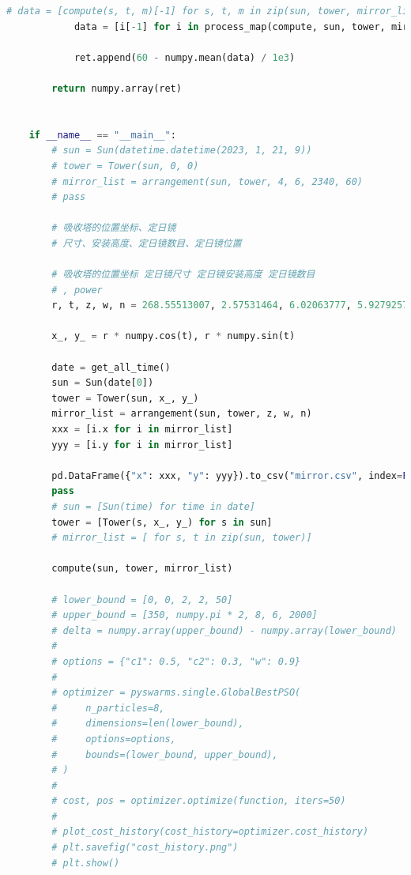 \documentclass[withoutpreface,bwprint]{cumcmthesis} %
\begin{document}
\begin{appendices}
\begin{lstlisting}[language=python]
            # data = [compute(s, t, m)[-1] for s, t, m in zip(sun, tower, mirror_list)]
            data = [i[-1] for i in process_map(compute, sun, tower, mirror_list)]
    
            ret.append(60 - numpy.mean(data) / 1e3)
    
        return numpy.array(ret)
    
    
    if __name__ == "__main__":
        # sun = Sun(datetime.datetime(2023, 1, 21, 9))
        # tower = Tower(sun, 0, 0)
        # mirror_list = arrangement(sun, tower, 4, 6, 2340, 60)
        # pass
    
        # 吸收塔的位置坐标、定日镜
        # 尺寸、安装高度、定日镜数目、定日镜位置
    
        # 吸收塔的位置坐标 定日镜尺寸 定日镜安装高度 定日镜数目
        # , power
        r, t, z, w, n = 268.55513007, 2.57531464, 6.02063777, 5.92792577, 1940
    
        x_, y_ = r * numpy.cos(t), r * numpy.sin(t)
    
        date = get_all_time()
        sun = Sun(date[0])
        tower = Tower(sun, x_, y_)
        mirror_list = arrangement(sun, tower, z, w, n)
        xxx = [i.x for i in mirror_list]
        yyy = [i.y for i in mirror_list]
    
        pd.DataFrame({"x": xxx, "y": yyy}).to_csv("mirror.csv", index=False)
        pass
        # sun = [Sun(time) for time in date]
        tower = [Tower(s, x_, y_) for s in sun]
        # mirror_list = [ for s, t in zip(sun, tower)]
    
        compute(sun, tower, mirror_list)
    
        # lower_bound = [0, 0, 2, 2, 50]
        # upper_bound = [350, numpy.pi * 2, 8, 6, 2000]
        # delta = numpy.array(upper_bound) - numpy.array(lower_bound)
        #
        # options = {"c1": 0.5, "c2": 0.3, "w": 0.9}
        #
        # optimizer = pyswarms.single.GlobalBestPSO(
        #     n_particles=8,
        #     dimensions=len(lower_bound),
        #     options=options,
        #     bounds=(lower_bound, upper_bound),
        # )
        #
        # cost, pos = optimizer.optimize(function, iters=50)
        #
        # plot_cost_history(cost_history=optimizer.cost_history)
        # plt.savefig("cost_history.png")
        # plt.show()
    
\end{lstlisting}

\end{appendices}
\end{document}
